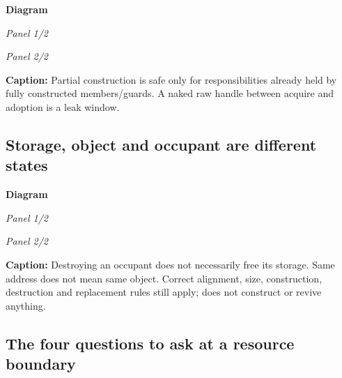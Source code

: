 \par\medskip\noindent\textbf{Diagram}\par
\par\noindent\textit{Panel 1/2}\par{}\par
\par\noindent\textit{Panel 2/2}\par{}\par

\textbf{Caption:} Partial construction is safe only for responsibilities already held by fully constructed members/guards. A naked raw handle between acquire and adoption is a leak window.

\subsection{Storage, object and occupant are different states}\label{appendix-960160274237-storage-object-and-occupant-are-different-states}

\hypertarget{appendix-960160274237-storage-object-and-occupant-are-different-states}{}

\par\medskip\noindent\textbf{Diagram}\par
\par\noindent\textit{Panel 1/2}\par{}\par
\par\noindent\textit{Panel 2/2}\par{}\par

\textbf{Caption:} Destroying an occupant does not necessarily free its storage. Same address does not mean same object. Correct alignment, size, construction, destruction and replacement rules still apply;  does not construct or revive anything.

\subsection{The four questions to ask at a resource boundary}\label{appendix-960160274237-the-four-questions-to-ask-at-a-resource-boundary}

